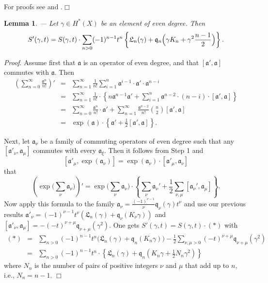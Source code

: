 \documentclass[twoside,11pt]{article}
\newtheorem{lemma}[theorem]{Lemma}
\newcommand{\prf}{{\kursiv Proof}. }
\newcommand{\qed}{\hspace*{\fill}$\Box$\vspace{2ex}}
\newcommand{\kursiv}{\sl}
\newcommand{\gotha}{{\mathfrak a}}
\newcommand{\gothq}{{\mathfrak q}}
\newcommand{\gothL}{{\mathfrak L}}
\newcommand{\qq}{\gothq}
\newcommand{\LL}{\gothL}
\begin{document}
For proofs see \cite{NakajimaLectures} and \cite{Grojnowski}.\qed

\begin{lemma}--- Let $\gamma\in H^*(X)$ be an element of even degree.
Then
$$S'(\gamma,t)=S(\gamma,t)\cdot\sum_{n>0}(-1)^{n-1}
t^n\left\{\LL_n(\gamma)+\qq_n\Bigl(\gamma K_n+\gamma^2\frac{n-1}{2}\Bigr)
\right\}.$$
\end{lemma}


\prf Assume first that $\gotha$ is an operator of even degree, and that
$[\gotha',\gotha]$ commutes with $\gotha$. Then
\begin{eqnarray*}
\left(\sum_{n=0}^\infty\frac{\gotha^n}{n!}\right)'&=&\sum_{n=1}^\infty\frac{1}{n!}
\sum_{i=1}^n \gotha^{i-1}\cdot\gotha'\cdot\gotha^{n-i}\\
&=&\sum_{n=1}^\infty\frac{1}{n!}\cdot\left\{n\gotha^{n-1}\gotha'+
\sum_{i=1}^n\gotha^{n-2}\cdot(n-i)\cdot[\gotha',\gotha]\right\}\\
&=&\sum_{n=0}^\infty\frac{\gotha^n}{n!}\cdot\gotha'+\sum_{n=1}^\infty\frac{
\gotha^{n-2}}{n!}\binom{n}{2}[\gotha',\gotha]\\
&=&\exp(\gotha)\cdot\left\{\gotha'+\frac{1}{2}[\gotha',\gotha]\right\}.
\end{eqnarray*}

Next, let $\gotha_\nu$ be a family of commuting operators of even degree such
that any $[\gotha'_\nu,\gotha_\mu]$ commutes with every $\gotha_\xi$. Then it 
follows from Step 1 and $$[\gotha'_\mu,\exp(\gotha_\nu)]=\exp(\gotha_\nu)\cdot[\gotha'_\mu,\gotha_\nu]$$
that
$$\left(\exp\Big(\sum_\nu\gotha_\nu\Big)\right)'=
\exp\Big(\sum_\nu\gotha_\nu\Big)
\cdot\left\{\sum_{\nu}\gotha_\nu'+
\frac{1}{2}\sum_{\nu,\mu}[\gotha_\nu',\gotha_\mu]\right\}.$$
Now apply this formula to the family $\gotha_\nu=\frac{(-1)^{\nu-1}}{\nu}\qq_{\nu}(\gamma)t^\nu$
and use our previous results
$\gotha'_\nu=(-1)^{\nu-1}t^\nu(\LL_n(\gamma)+\qq_\nu(K_\nu\gamma))$
and $[\gotha'_\nu,\gotha_\mu]=-(-t)^{\nu+\mu}\qq_{\nu+\mu}(\gamma^2)$. 
One gets $S'(\gamma,t)=S(\gamma,t)\cdot(*)$ with
\begin{eqnarray*}
(*)&=&\sum_{n>0}(-1)^{n-1}t^n\big(\LL_n(\gamma)+\qq_n(K_n\gamma)\big)
-\frac{1}{2}\sum_{\nu,\mu>0}(-t)^{\nu+\mu}\qq_{\nu+\mu}(\gamma^2) \\
&=&\sum_{n>0}(-1)^{n-1}t^{n}\cdot
\left\{\LL_n(\gamma)+\qq_n(K_n\gamma+\frac{1}{2}N_n\gamma^2)\right\} \end{eqnarray*}
where $N_n$ is the number of pairs of positive integers $\nu$ and $\mu$ that
add up to $n$, i.e., $N_n=n-1$. 
\qed
\end{document}
